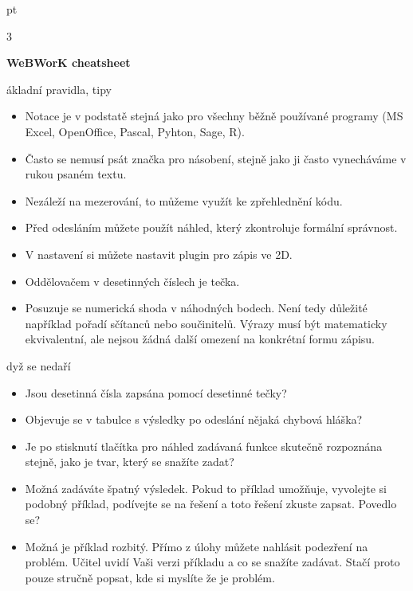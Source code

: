 \documentclass[10pt]{article}
\def\nadpis#1\par{\par\bigskip\noindent \textbf{#1} \par}
\begin{document}
 pt
\pagestyle{empty}

\setlength\columnsep{40pt}

\begin{multicols}3
  {\centering \textbf{WeBWorK cheatsheet}

    }

\nadpis Základní pravidla, tipy

\begin{itemize}
\itemsep=-3pt\raggedright
\item Notace je v podstatě stejná jako pro všechny běžně používané programy (MS Excel, OpenOffice, Pascal, Pyhton, Sage, R).
\item Často se nemusí psát značka pro násobení, stejně jako ji často vynecháváme v rukou psaném textu.
\item Nezáleží na mezerování, to můžeme využít ke zpřehlednění kódu.
\item Před odesláním můžete použít náhled, který zkontroluje formální správnost.
\item V nastavení si můžete nastavit plugin pro zápis ve 2D.
\item Oddělovačem v desetinných číslech je tečka.
\item Posuzuje se numerická shoda v náhodných bodech. Není tedy důležité například pořadí sčítanců nebo součinitelů. Výrazy musí být matematicky ekvivalentní, ale nejsou žádná další omezení na konkrétní formu zápisu.
\end{itemize}

\nadpis Když se nedaří

\begin{itemize}  \itemsep=-3pt\raggedright
\item Jsou desetinná čísla zapsána pomocí desetinné tečky?
\item 
Objevuje se v tabulce s výsledky po odeslání nějaká chybová hláška?
\item 
Je po stisknutí tlačítka pro náhled zadávaná funkce skutečně rozpoznána stejně, jako je tvar, který se snažíte zadat?
\item 
Možná zadáváte špatný výsledek. Pokud to příklad umožňuje, vyvolejte si podobný příklad, podívejte se na řešení a toto řešení zkuste zapsat. Povedlo se?
\item 
Možná je příklad rozbitý. Přímo z úlohy můžete nahlásit podezření na problém. Učitel uvidí Vaši verzi příkladu a co se snažíte zadávat. Stačí proto pouze stručně popsat, kde si myslíte že je problém.
\end{itemize}
\vfill \null
\columnbreak


\end{multicols}
\end{document}
